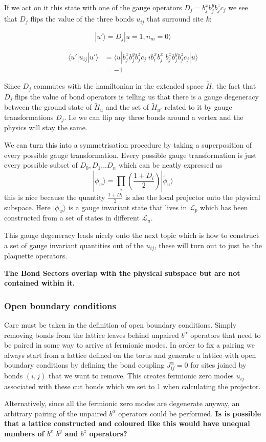 If we act on it this state with one of the gauge operators
\(D_j = b_j^x b_j^y b_j^z c_j\) we see that \(D_j\) flips the value of
the three bonds \(u_{ij}\) that surround site \(k\):

\[ |u'\rangle = D_j |u=1, n_m = 0\rangle\]

\[ \begin{aligned}
\langle u'|u_{ij}|u'\rangle &=  \langle u| b_j^x b_j^y b_j^z c_j \;ib^x_i b^x_j\; b_j^x b_j^y b_j^z c_j|u\rangle\\
&= -1
\end{aligned}\]

Since \(D_j\) commutes with the hamiltonian in the extended space
\(\tilde{H}\), the fact that \(D_j\) flips the value of bond operators
is telling us that there is a gauge degeneracy between the ground state
of \(\tilde{H}_u\) and the set of \(\tilde{H}_{u'}\) related to it by
gauge transformations \(D_j\). I.e we can flip any three bonds around a
vertex and the physics will stay the same.

We can turn this into a symmetrisation procedure by taking a
superposition of every possible gauge transformation. Every possible
gauge transformation is just every possible subset of
\({D_0, D_1 ... D_n}\) which can be neatly expressed as
\[|\phi_w\rangle = \prod_i \left( \frac{1 + D_i}{2}\right) |\tilde{\phi}_u\rangle\]
this is nice because the quantity \(\frac{1 + D_i}{2}\) is also the
local projector onto the physical subspace. Here \(|\phi_w\rangle\) is a
gauge invariant state that lives in \(\mathcal{L}_p\) which has been
constructed from a set of states in different \(\mathcal{L}_u\).

This gauge degeneracy leads nicely onto the next topic which is how to
construct a set of gauge invariant quantities out of the \(u_{ij}\),
these will turn out to just be the plaquette operators.

\textbf{The Bond Sectors overlap with the physical subspace but are not
contained within it.}

\hypertarget{open-boundary-conditions}{%
\subsubsection{Open boundary
conditions}\label{open-boundary-conditions}}

Care must be taken in the definition of open boundary conditions. Simply
removing bonds from the lattice leaves behind unpaired \(b^\alpha\)
operators that need to be paired in some way to arrive at fermionic
modes. In order to fix a pairing we always start from a lattice defined
on the torus and generate a lattice with open boundary conditions by
defining the bond coupling \(J^{\alpha}_{ij} = 0\) for sites joined by
bonds \((i,j)\) that we want to remove. This creates fermionic zero
modes \(u_{ij}\) associated with these cut bonds which we set to 1 when
calculating the projector.

Alternatively, since all the fermionic zero modes are degenerate anyway,
an arbitrary pairing of the unpaired \(b^\alpha\) operators could be
performed. \textbf{Is is possible that a lattice constructed and
coloured like this would have unequal numbers of \(b^x\) \(b^y\) and
\(b^z\) operators?}
